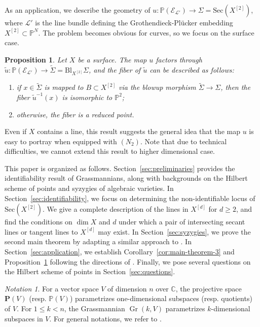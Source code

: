 \documentclass[a4paper]{amsart}
\numberwithin{equation}{section}
\theoremstyle{plain}
\newtheorem{prop}[thm]{Proposition}
\theoremstyle{definition}
\theoremstyle{remark}
\newtheorem*{notation}{Notation}
\numberwithin{figure}{section}
\numberwithin{table}{section}
\numberwithin{equation}{section}
\def \CC {\mathbb{C}}
\def \PP {\mathbb{P}}
\def \Ecal {\mathcal{E}}
\def \Lcal {\mathcal{L}}
\def \Pbf {\mathbf{P}}
\DeclareMathOperator{\Gr}{Gr}
\begin{document}
As an application, we describe the geometry of $u:\PP(\Ecal_{\Lcal'}) \rightarrow \Sigma = \mathrm{Sec}(X^{[2]})$, where $\Lcal'$ is the line bundle defining the Grothendieck-Pl\"ucker embedding $X^{[2]} \subset \PP^N$.
The problem becomes obvious for curves, so we focus on the surface case.

\begin{prop} \label{prop:application-theorem}
    Let $X$ be a surface.
    The map $u$ factors through $\widetilde{u}: \PP(\Ecal_{\Lcal'}) \rightarrow \widetilde{\Sigma} = \mathrm{Bl}_{X^{[2]}} \Sigma$, and the fiber of $\widetilde{u}$ can be described as follows:
    \begin{enumerate}
        \item if $x \in \widetilde{\Sigma}$ is mapped to $B \subset X^{[2]}$ via the blowup morphism $\widetilde{\Sigma} \rightarrow \Sigma$, then the fiber $\widetilde{u}^{-1}(x)$ is isomorphic to $\PP^2$;
        \item otherwise, the fiber is a reduced point.
    \end{enumerate}
\end{prop}

Even if $X$ contains a line, this result suggests the general idea that the map $u$ is easy to portray when equipped with $(N_2)$.
Note that due to technical difficulties, we cannot extend this result to higher dimensional case.

This paper is organized as follows.
Section~\ref{sec:preliminaries} provides the identifiability result of Grassmannians, along with backgrounds on the Hilbert scheme of points and syzygies of algebraic varieties.
In Section~\ref{sec:identifiability}, we focus on determining the non-identifiable locus of $\mathrm{Sec}(X^{[2]})$.
We give a complete description of the lines in $X^{[d]}$ for $d \geq 2$, and find the conditions on $\dim X$ and $d$ under which a pair of intersecting secant lines or tangent lines to $X^{[d]}$ may exist.
In Section~\ref{sec:syzygies}, we prove the second main theorem by adapting a similar approach to \cite[Theorem~1]{EL1993}.
In Section~\ref{sec:application}, we establish Corollary~\ref{cor:main-theorem-3} and Proposition~\ref{prop:application-theorem} following the directions of \cite{Vermeire2001}.
Finally, we pose several questions on the Hilbert scheme of points in Section~\ref{sec:questions}.

\begin{notation}
For a vector space $V$ of dimension $n$ over $\CC$, the projective space $\Pbf(V)$ (resp. $\PP(V)$) parametrizes one-dimensional subspaces (resp. quotients) of $V$.
For $1 \leq k < n$, the Grassmannian $\Gr(k,V)$ parametrizes $k$-dimensional subspaces in $V$.
For general notations, we refer to \cite{Hartshorne1977}.
\end{notation}
\end{document}

